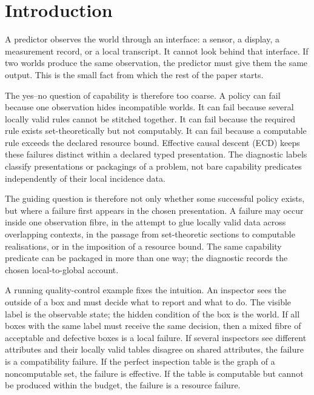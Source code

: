 \documentclass[11pt]{article}
\theoremstyle{plain}
\theoremstyle{definition}
\theoremstyle{remark}
\begin{document}
\tableofcontents

\section{Introduction}\label{sec:intro}

A predictor observes the world through an interface: a sensor, a display, a
measurement record, or a local transcript. It cannot look behind that interface.
If two worlds produce the same observation, the predictor must give them the same
output. This is the small fact from which the rest of the paper starts.

The yes--no question of capability is therefore too coarse. A policy can fail
because one observation hides incompatible worlds. It can fail because several
locally valid rules cannot be stitched together. It can fail because the required
rule exists set-theoretically but not computably. It can fail because a
computable rule exceeds the declared resource bound. Effective causal descent
(ECD) keeps these failures distinct within a declared typed presentation. The
diagnostic labels classify presentations or packagings of a problem, not bare
capability predicates independently of their local incidence data.

The guiding question is therefore not only whether some successful policy exists,
but where a failure first appears in the chosen presentation. A failure may occur
inside one observation fibre, in the attempt to glue locally valid data across
overlapping contexts, in the passage from set-theoretic sections to computable
realisations, or in the imposition of a resource bound. The same capability
predicate can be packaged in more than one way; the diagnostic records the
chosen local-to-global account.

A running quality-control example fixes the intuition. An inspector sees the
outside of a box and must decide what to report and what to do. The visible label
is the observable state; the hidden condition of the box is the world. If all
boxes with the same label must receive the same decision, then a mixed fibre of
acceptable and defective boxes is a local failure. If several inspectors see
different attributes and their locally valid tables disagree on shared
attributes, the failure is a compatibility failure. If the perfect inspection
table is the graph of a noncomputable set, the failure is effective. If the table
is computable but cannot be produced within the budget, the failure is a resource
failure.
\end{document}

